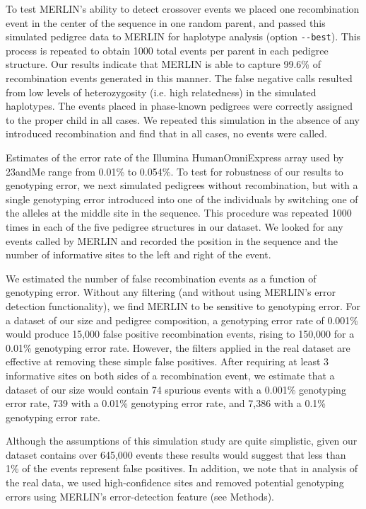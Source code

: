 To test MERLIN's ability to detect crossover events we placed one  
recombination event in the center of the sequence in one random parent, and  
passed this simulated pedigree data to MERLIN for haplotype analysis (option
\verb|--best|).  This process is repeated to obtain 1000 total events per parent in each  
pedigree structure. Our results indicate that MERLIN is able to capture 99.6\% of  
recombination events generated in this manner. The false negative calls resulted  
from low levels of heterozygosity (i.e. high relatedness) in the simulated haplotypes.  
The events placed in phase-known pedigrees were correctly assigned to the proper  
child in all cases. We repeated this simulation in the absence of any introduced  
recombination and find that in all cases, no events were called.  

Estimates of the error rate of the Illumina HumanOmniExpress array used by  
23andMe range from 0.01\%\cite{Illumina2013}  to 0.054\%\cite{Imai2010}.  To test for robustness of our results to  
genotyping error, we next simulated pedigrees without recombination, but with a  
single genotyping error introduced into one of the individuals by switching one of  
the alleles at the middle site in the sequence.  This procedure was repeated 1000  
times in each of the five pedigree structures in our dataset.  We looked for any  
events called by MERLIN and recorded the position in the sequence and the number  
of informative sites to the left and right of the event.    

We estimated the number of false recombination events as a function of  
genotyping error.  Without any filtering (and without using MERLIN's error  
detection functionality), we find MERLIN to be sensitive to genotyping error. For a  
dataset of our size and pedigree composition, a genotyping error rate of 0.001\%  
would produce 15,000 false positive recombination events, rising to 150,000 for a  
0.01\% genotyping error rate. However, the filters applied in the real dataset are  
effective at removing these simple false positives. After requiring at least 3  
informative sites on both sides of a recombination event, we estimate that a dataset  
of our size would contain 74 spurious events with a 0.001\% genotyping error rate,  
739 with a 0.01\% genotyping error rate, and 7,386 with a 0.1\% genotyping error  
rate.   

Although the assumptions of this simulation study are quite simplistic, given  
our dataset contains over 645,000 events these results would suggest that less than  
1\% of the events represent false positives. In addition, we note that in analysis of  
the real data, we used high-confidence sites and removed potential
genotyping errors using MERLIN's error-detection feature (see Methods).  

